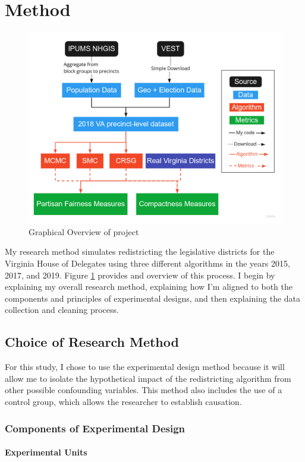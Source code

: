 \section{Method}

\begin{figure}
    \includegraphics[width=0.6\linewidth]{img/flowchart_final.pdf}
    \caption{Graphical Overview of project}
    \label{fig:flowchart}
\end{figure}

My research method simulates redistricting the legislative districts for the Virginia House of Delegates using three different algorithms in the years 2015, 2017, and 2019. Figure \ref{fig:flowchart} provides and overview of this process. I begin by explaining my overall research method, explaining how I'm aligned to both the components and principles of experimental designs, and then explaining the data collection and cleaning process.

\subsection{Choice of Research Method}

For this study, I chose to use the experimental design method because it will allow me to isolate the hypothetical impact of the redistricting algorithm from other possible confounding variables. This method also includes the use of a control group, which allows the researcher to establish causation. 

\subsubsection{Components of Experimental Design}

\paragraph{Experimental Units}


